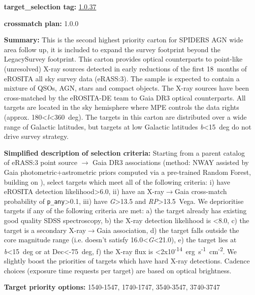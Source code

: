 \noindent\textbf{target\_selection tag:}
\href{https://github.com/sdss/target_selection/tree/1.0.37/}{1.0.37}

\noindent\textbf{crossmatch plan:} 1.0.0

\noindent\textbf{Summary:} This is the second highest priority carton for SPIDERS
AGN wide area follow up, it is included to expand the survey footprint
beyond the LegacySurvey footprint. This carton provides optical
counterparts to point-like (unresolved) X-ray sources detected in early
reductions of the first 18~months of eROSITA all sky survey data
(eRASS:3). The sample is expected to contain a mixture of QSOs, AGN,
stars and compact objects. The X-ray sources have been cross-matched by
the eROSITA-DE team to Gaia DR3 optical counterparts. All targets are
located in the sky hemisphere where MPE controls the data rights
(approx. 180\textless{}\emph{l}\textless360~deg). The targets in this
carton are distributed over a wide range of Galactic latitudes, but
targets at low Galactic latitudes
\textbar{}\emph{b}\textbar\textless15~deg do not drive survey strategy.

\noindent\textbf{Simplified description of selection criteria:} Starting from a
parent catalog of eRASS:3 point source $\rightarrow$ Gaia DR3 associations (method:
NWAY assisted by Gaia photometric+astrometric priors computed via a
pre-trained Random Forest, building on
\citealt{Salvato2022}), select targets which meet all of the following criteria:
i) have eROSITA detection likelihood\textgreater6.0, ii) have an
X-ray$\rightarrow$Gaia cross-match probability of \texttt{p\_any}\textgreater0.1,
iii) have \emph{G}\textgreater13.5 and \emph{RP}\textgreater13.5~Vega.
We deprioritise targets if any of the following criteria are met: a) the
target already has existing good quality SDSS spectroscopy, b) the X-ray
detection likelihood is \textless8.0, c) the target is a secondary
X-ray$\rightarrow$Gaia association, d) the target falls outside the core magnitude
range (i.e. doesn't satisfy 16.0\textless{}\emph{G}\textless21.0), e)
the target lies at \textbar{}\emph{b}\textbar\textless15~deg or at
Dec\textless-75~deg, f) the X-ray flux is
\textless2x10\textsuperscript{-14}~erg~s\textsuperscript{-1}~cm\textsuperscript{-2}.
We slightly boost the priorities of targets which have hard X-ray
detections. Cadence choices (exposure time requests per target) are
based on optical brightness.


\noindent\textbf{Target priority options:} 1540-1547, 1740-1747, 3540-3547,
3740-3747


